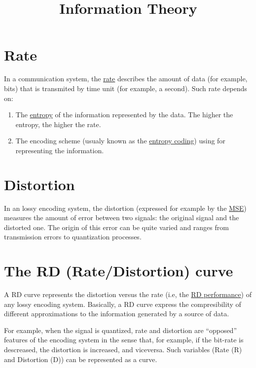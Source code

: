 
\title{Information Theory}
\maketitle

\tableofcontents

\section{Rate}

In a communication system, the
\href{https://en.wikipedia.org/wiki/Bit_rate}{rate} describes the
amount of data (for example, bits) that is transmited by time unit
(for example, a second). Such rate depends on:
\begin{enumerate}
\item The
  \href{https://en.wikipedia.org/wiki/Entropy_(information_theory)}{entropy}
  of the information represented by the data. The higher the entropy,
  the higher the rate.
\item The encoding scheme (usualy known as the
  \href{https://en.wikipedia.org/wiki/Entropy_coding}{entropy coding})
  using for representing the information.
\end{enumerate}

\section{Distortion}

In an lossy encoding system, the distortion (expressed for example by
the \href{https://en.wikipedia.org/wiki/Mean_squared_error}{MSE})
measures the amount of error between two signals: the original signal
and the distorted one. The origin of this error can be quite varied
and ranges from transmission errors to quantization processes.

\section{The RD (Rate/Distortion) curve}

A RD curve represents the distortion versus the rate (i.e, the
\href{https://en.wikipedia.org/wiki/Rate-distortion_theory}{RD
  performance}) of any lossy encoding system. Basically, a RD curve
express the compresibility of different approximations to the
information generated by a source of data.


For example, when the signal is quantized, rate and distortion are
``opposed'' features of the encoding system in the sense that, for
example, if the bit-rate is descreased, the distortion is increased,
and viceversa. Such variables (Rate (R) and Distortion (D)) can be
represented as a curve.

